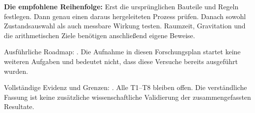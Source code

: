 \textbf{Die empfohlene Reihenfolge:} Erst die ursprünglichen Bauteile und
Regeln festlegen. Dann genau einen daraus hergeleiteten Prozess prüfen.
Danach sowohl Zustandsauswahl als auch messbare Wirkung testen. Raumzeit,
Gravitation und die arithmetischen Ziele benötigen anschließend eigene Beweise.

\small Ausführliche Roadmap:
.
Die Aufnahme in diesen Forschungsplan startet keine weiteren Aufgaben
und bedeutet nicht, dass diese Versuche bereits ausgeführt wurden.

\small Vollständige Evidenz und Grenzen:
.
Alle T1--T8 bleiben offen. Die verständliche Fassung ist keine zusätzliche
wissenschaftliche Validierung der zusammengefassten Resultate.

